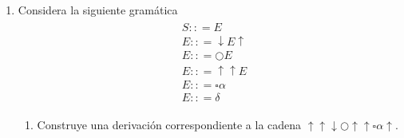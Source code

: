 \documentclass[10pt,letterpaper]{article}
\begin{document}
\begin{enumerate}
    \item Considera la siguiente gramática
        \begin{equation*} \begin{split} \begin{aligned}
            &S :: = E \\
            &E :: = \downarrow E \uparrow \\
            &E :: = \bigcirc E \\
            &E :: = \uparrow \uparrow E \\
            &E :: = \square \alpha \\
            &E :: = \delta
        \end{aligned} \end{split} \end{equation*}

        \begin{enumerate}
            \item Construye una derivación correspondiente a la cadena
                  $\uparrow \uparrow \downarrow \bigcirc \uparrow \uparrow \square \alpha \uparrow$.

                \begin{center}
                \end{center}


\end{enumerate}
\end{enumerate}
\end{document}
